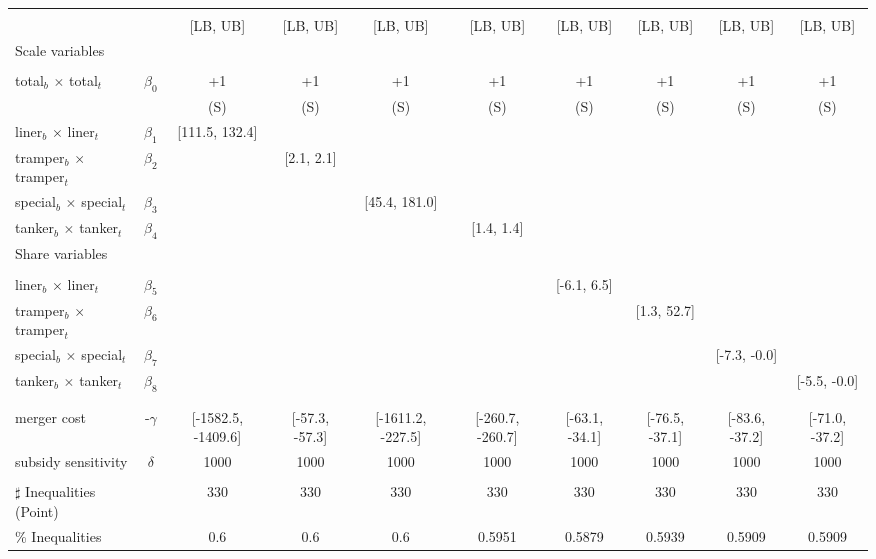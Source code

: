 \begin{tabular}{@{\extracolsep{5pt}}lccccccccc}
\toprule 
 &  &  &  &  &  &  &  &  &  \\
 &  & [LB, UB] & [LB, UB] & [LB, UB] & [LB, UB] & [LB, UB] & [LB, UB] & [LB, UB] & [LB, UB] \\
\midrule 
Scale variables &  &  &  &  &  &  &  \\
 &  &  &  &  &  &  &  &  \\
total$_{b}$ $\times$ total$_{t}$ & $\beta_0$ & +1 & +1 & +1 & +1 & +1 & +1 & +1 & +1 \\
 &  & (S) & (S) & (S) & (S) & (S) & (S) & (S) & (S) \\
liner$_{b}$ $\times$ liner$_{t}$ & $\beta_1$ & [111.5, 132.4] &  &  &  &  &  &  &  \\
tramper$_{b}$ $\times$ tramper$_{t}$ & $\beta_2$ &  & [2.1, 2.1] &  &  &  &  &  &  \\
special$_{b}$ $\times$ special$_{t}$ & $\beta_3$ &  &  & [45.4, 181.0] &  &  &  &  &  \\
tanker$_{b}$ $\times$ tanker$_{t}$ & $\beta_4$ &  &  &  & [1.4, 1.4] &  &  &  &  \\
Share variables &  &  &  &  &  &  &  &  &  \\
 &  &  &  &  &  &  &  &  &  \\
liner$_{b}$ $\times$ liner$_{t}$ & $\beta_5$ &  &  &  &  & [-6.1, 6.5] &  &  &  \\
tramper$_{b}$ $\times$ tramper$_{t}$ & $\beta_6$ &  &  &  &  &  & [1.3, 52.7] &  &  \\
special$_{b}$ $\times$ special$_{t}$ & $\beta_7$ &  &  &  &  &  &  & [-7.3, -0.0] &  \\
tanker$_{b}$ $\times$ tanker$_{t}$ & $\beta_8$ &  &  &  &  &  &  &  & [-5.5, -0.0] \\
 &  &  &  &  &  &  &  &  &  \\
 &  &  &  &  &  &  &  &  &  \\
merger cost & -$\gamma$ & [-1582.5, -1409.6] & [-57.3, -57.3] & [-1611.2, -227.5] & [-260.7, -260.7] & [-63.1, -34.1] & [-76.5, -37.1] & [-83.6, -37.2] & [-71.0, -37.2] \\
subsidy sensitivity & $\delta$ & 1000 & 1000 & 1000 & 1000 & 1000 & 1000 & 1000 & 1000 \\
 &  &  &  &  &  &  &  &  &  \\
\hline 
$\sharp$ Inequalities (Point) &  & 330 & 330 & 330 & 330 & 330 & 330 & 330 & 330 \\
\% Inequalities &  & 0.6 & 0.6 & 0.6 & 0.5951 & 0.5879 & 0.5939 & 0.5909 & 0.5909 \\
\bottomrule 
\end{tabular}

